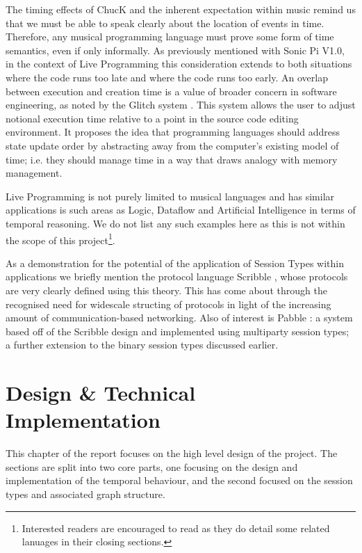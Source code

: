 \documentclass[11pt, abstracton, twoside, titlepage=true]{scrartcl}
\begin{document}
The timing effects of ChucK and the inherent expectation within music remind 
us that we must be able to speak clearly about the location of events in time. 
Therefore, any musical programming language must prove some form of time 
semantics, even if only informally. As previously mentioned with Sonic Pi 
V1.0, in the context of Live Programming this consideration extends to both 
situations where the code runs too late and where the code runs too early. An 
overlap between execution and creation time is a value of broader concern in 
software engineering, as noted by the Glitch system \cite{ME14}. This system 
allows the user to adjust notional execution time relative to a point in the 
source code editing environment. It proposes the idea that programming 
languages should address state update order by abstracting away from the 
computer's existing model of time; i.e. they should manage time in a way that 
draws analogy with memory management. 

Live Programming is not purely limited to musical languages and has similar 
applications is such areas as Logic, Dataflow and Artificial Intelligence in
terms of temporal reasoning. We do not list any such examples here as this is
not within the scope of this project\footnote{Interested readers are encouraged
to read \cite{AOB14} as they do detail some related lanuages in their closing 
sections.}.

As a demonstration for the potential of the application of Session Types 
within applications we briefly mention the protocol language Scribble 
\cite{HMBCY11}, whose protocols are very clearly defined using this theory. 
This has come about through the recognised need for widescale structing of 
protocols in light of the increasing amount of communication-based networking. 
Also of interest is Pabble \cite{NY14}: a system based off of the Scribble design 
and implemented using multiparty session types; a further extension to the 
binary session types discussed earlier.
\newpage

\section{Design \& Technical Implementation}
\thispagestyle{empty}
This chapter of the report focuses on the high level design of the project.
The sections are split into two core parts, one 
focusing on the design and implementation of the temporal behaviour, and
the second focused on the session types and associated graph structure.
\end{document}
